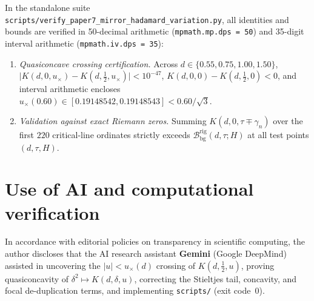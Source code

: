 \documentclass[11pt,reqno]{amsart}
\theoremstyle{definition}
\theoremstyle{remark}
\numberwithin{equation}{section}
\begin{document}
{\sloppy
In the standalone suite \texttt{scripts/\allowbreak verify\_\allowbreak paper7\_\allowbreak mirror\_\allowbreak hadamard\_\allowbreak variation.py}, all identities and bounds are verified in 50-decimal arithmetic (\texttt{mpmath.mp.dps = 50}) and 35-digit interval arithmetic (\texttt{mpmath.iv.dps = 35}):\par}
\begin{enumerate}[label=\textup{(\arabic*)},leftmargin=2.2em]
\item \textit{Quasiconcave crossing certification.} Across $d \in \{0.55, 0.75, 1.00, 1.50\}$, $\lvert K(d,0,u_{\times}) - K(d,\frac{1}{2},u_{\times})\rvert < 10^{-47}$, $K(d,0,0) - K(d,\frac{1}{2},0) < 0$, and interval arithmetic encloses $u_{\times}(0.60) \in [0.19148542, 0.19148543] < 0.60/\sqrt{3}$.
\item \textit{Validation against exact Riemann zeros.} Summing $K(d, 0, \tau \mp \gamma_n)$ over the first $220$ critical-line ordinates strictly exceeds $\mathcal{B}_{\mathrm{bg}}^{\mathrm{rig}}(d, \tau; H)$ at all test points $(d, \tau, H)$.
\end{enumerate}

\section*{Use of AI and computational verification}

{\sloppy
In accordance with editorial policies on transparency in scientific computing, the author discloses that the AI research assistant \textbf{Gemini} (Google DeepMind) assisted in uncovering the $\lvert u\rvert < u_{\times}(d)$ crossing of $K(d,\frac{1}{2},u)$, proving quasiconcavity of $\delta^2 \mapsto K(d,\delta,u)$, correcting the Stieltjes tail, concavity, and focal de-duplication terms, and implementing \texttt{scripts/}\allowbreak\texttt{} (exit code~$0$).\par}
\end{document}
